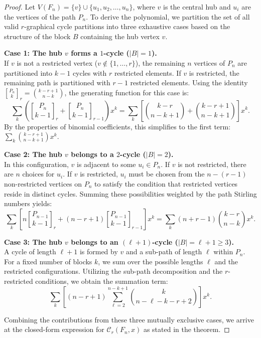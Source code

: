\documentclass{amsart}
\newcounter{cases}
\theoremstyle{definition}
\begin{document}
\begin{proof}
Let $V(F_n) = \{v\} \cup \{u_1, u_2, \dots, u_n\}$, where $v$ is the central hub and $u_i$ are the vertices of the path $P_n$. To derive the polynomial, we partition the set of all valid $r$-graphical cycle partitions into three exhaustive cases based on the structure of the block $B$ containing the hub vertex $v$.

\textbf{Case 1: The hub $v$ forms a $1$-cycle ($|B|=1$).} \\
If $v$ is not a restricted vertex ($v \notin \{1, \dots, r\}$), the remaining $n$ vertices of $P_n$ are partitioned into $k-1$ cycles with $r$ restricted elements. If $v$ is restricted, the remaining path is partitioned with $r-1$ restricted elements. Using the identity ${P_n \brack k}_r = \binom{k-r+1}{n-k}$, the generating function for this case is:
\begin{equation*}
    \sum_{k} \left( {P_n \brack k-1}_r + {P_n \brack k-1}_{r-1} \right) x^k = \sum_{k} \left[ \binom{k-r}{n-k+1} + \binom{k-r+1}{n-k+1} \right] x^k.
\end{equation*}
By the properties of binomial coefficients, this simplifies to the first term: $\sum_k \binom{k-r+1}{n-k+1} x^k$.

\textbf{Case 2: The hub $v$ belongs to a $2$-cycle ($|B|=2$).} \\
In this configuration, $v$ is adjacent to some $u_i \in P_n$. If $v$ is not restricted, there are $n$ choices for $u_i$. If $v$ is restricted, $u_i$ must be chosen from the $n-(r-1)$ non-restricted vertices on $P_n$ to satisfy the condition that restricted vertices reside in distinct cycles. Summing these possibilities weighted by the path Stirling numbers yields:
\begin{equation*}
    \sum_{k} \left[ n {P_{n-1} \brack k-1}_r + (n-r+1) {P_{n-1} \brack k-1}_{r-1} \right] x^k = \sum_{k} (n+r-1) \binom{k-r}{n-k} x^k.
\end{equation*}

\textbf{Case 3: The hub $v$ belongs to an $(\ell+1)$-cycle ($|B| = \ell+1 \geq 3$).} \\
A cycle of length $\ell+1$ is formed by $v$ and a sub-path of length $\ell$ within $P_n$. For a fixed number of blocks $k$, we sum over the possible lengths $\ell$ and the restricted configurations. Utilizing the sub-path decomposition and the $r$-restricted conditions, we obtain the summation term:
\begin{equation*}
    \sum_{k} \left[ (n-r+1) \sum_{\ell=2}^{n-k+1} \binom{k}{n-\ell-k-r+2} \right] x^k.
\end{equation*}



Combining the contributions from these three mutually exclusive cases, we arrive at the closed-form expression for $\mathcal{C}_r(F_n, x)$ as stated in the theorem.
\end{proof}
\end{document}
